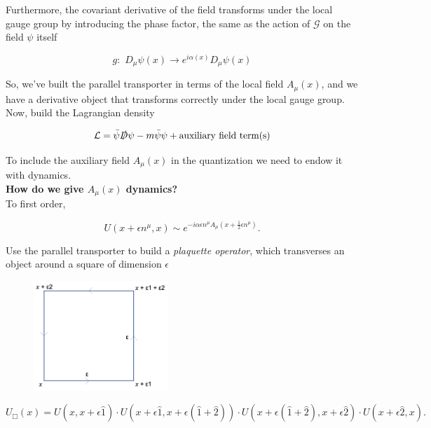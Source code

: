 \noindent Furthermore, the covariant derivative of the field transforms under the local gauge group by introducing the phase factor, the same as the action of $\mathcal{G}$ on the field $\psi$ itself

\begin{equation}
g: \,\, D_\mu \psi (x) \rightarrow e^{i \alpha (x)} D_\mu \psi (x)
\end{equation}

\noindent So, we've built the parallel transporter in terms of the local field $A_\mu (x)$, and we have a derivative object that transforms correctly under the local gauge group. Now, build the Lagrangian density

\begin{equation}
\mathcal{L} = \bar{\psi} \slashed{D} \psi - m \bar{\psi} \psi + \text{auxiliary field term(s)}
\end{equation}

\noindent To include the auxiliary field $A_\mu (x)$ in the quantization we need to endow it with dynamics. \\

\noindent \textbf{How do we give $A_\mu (x)$ dynamics?} \\

\noindent To first order,

\begin{equation}
U(x+\epsilon n^\mu , x) \sim e^{-i\alpha \epsilon n^\mu A_\mu (x + \frac{1}{2} \epsilon n^\mu)}.
\end{equation}

\noindent Use the parallel transporter to build a \textit{plaquette operator}, which transverses an object around a square of dimension $\epsilon$

\begin{figure}[H]
	\centering
	\includegraphics[width=2in]{images/plaquette.png}
\end{figure}

\begin{equation}
U_\Box(x)  = U(x, x + \epsilon \hat{1}) \cdot U (x + \epsilon \hat{1}, x + \epsilon (\hat{1} + \hat{2})) \cdot U(x + \epsilon (\hat{1} + \hat{2}), x + \epsilon \hat{2}) \cdot U(x + \epsilon \hat{2}, x).
\end{equation}

